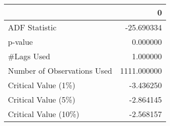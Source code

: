 \begin{tabular}{lr}
\toprule
{} &            0 \\
\midrule
ADF Statistic               &   -25.690334 \\
p-value                     &     0.000000 \\
\#Lags Used                  &     1.000000 \\
Number of Observations Used &  1111.000000 \\
Critical Value (1\%)         &    -3.436250 \\
Critical Value (5\%)         &    -2.864145 \\
Critical Value (10\%)        &    -2.568157 \\
\bottomrule
\end{tabular}
